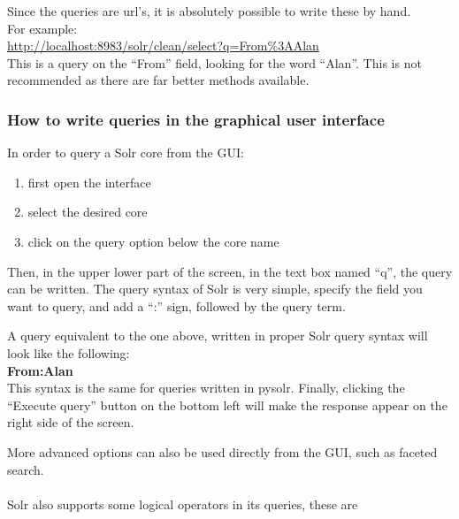 \documentclass[a4paper,english]{report}
\begin{document}
Since the queries are url's, it is absolutely possible to write these by hand.\\
For example:\\

\url{http://localhost:8983/solr/clean/select?q=From%3AAlan}\\

This is a query on the “From” field, looking for the word “Alan”.
This is not recommended as there are far better methods available.

\subsubsection{How to write queries in the graphical user interface}

In order to query a Solr core from the GUI:

\begin{enumerate}

\item first open the interface
\item select the desired core
\item click on the query option below the core name

\end{enumerate}
Then, in the upper lower part of the screen, in the text box named “q”, the query can be written. 
The query syntax of Solr is very simple, specify the field you want to query, and add a “:” sign, followed by the query term. 

A query equivalent to the one above, written in proper Solr query syntax will look like the following:\\


\textbf{From:Alan}\\


This syntax is the same for queries written in pysolr.
Finally, clicking the “Execute query” button on the bottom left will make the  response appear on the right side of the screen.

More advanced options can also be used directly from the GUI, such as faceted search.\\\\


Solr also supports some logical operators in its queries, these are 
\end{document}
